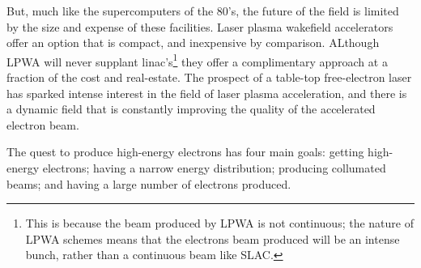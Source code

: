 \documentclass[12pt,letter]{article}
\begin{document}
 But, much like the supercomputers of the 80's, the future of the field is limited by the size and expense of these
 facilities. Laser plasma
 wakefield accelerators offer an option that is compact, and inexpensive by
 comparison. ALthough LPWA will never supplant linac's\footnote{This is because
     the beam produced by LPWA is not continuous; the nature of LPWA schemes
     means that the electrons beam produced will be an intense bunch, rather
 than a continuous beam like SLAC.} they offer a complimentary approach at a
 fraction of the cost and real-estate. The prospect of a table-top free-electron
 laser has sparked intense interest in the field of laser plasma acceleration,
 and there is a dynamic field that is constantly improving the quality of the
 accelerated electron beam.


 The quest to produce high-energy electrons has four main goals: getting
  high-energy electrons; having a narrow energy distribution; producing collumated beams; and having a large number of electrons
 produced.
\end{document}
